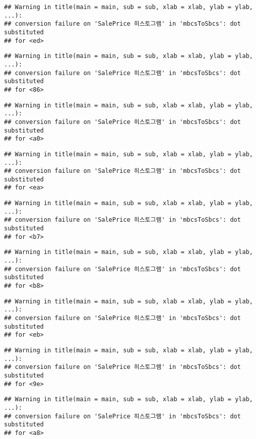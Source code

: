 \documentclass[
]{article}
\begin{document}
\begin{verbatim}
## Warning in title(main = main, sub = sub, xlab = xlab, ylab = ylab, ...):
## conversion failure on 'SalePrice 히스토그램' in 'mbcsToSbcs': dot substituted
## for <ed>
\end{verbatim}

\begin{verbatim}
## Warning in title(main = main, sub = sub, xlab = xlab, ylab = ylab, ...):
## conversion failure on 'SalePrice 히스토그램' in 'mbcsToSbcs': dot substituted
## for <86>
\end{verbatim}

\begin{verbatim}
## Warning in title(main = main, sub = sub, xlab = xlab, ylab = ylab, ...):
## conversion failure on 'SalePrice 히스토그램' in 'mbcsToSbcs': dot substituted
## for <a0>
\end{verbatim}

\begin{verbatim}
## Warning in title(main = main, sub = sub, xlab = xlab, ylab = ylab, ...):
## conversion failure on 'SalePrice 히스토그램' in 'mbcsToSbcs': dot substituted
## for <ea>
\end{verbatim}

\begin{verbatim}
## Warning in title(main = main, sub = sub, xlab = xlab, ylab = ylab, ...):
## conversion failure on 'SalePrice 히스토그램' in 'mbcsToSbcs': dot substituted
## for <b7>
\end{verbatim}

\begin{verbatim}
## Warning in title(main = main, sub = sub, xlab = xlab, ylab = ylab, ...):
## conversion failure on 'SalePrice 히스토그램' in 'mbcsToSbcs': dot substituted
## for <b8>
\end{verbatim}

\begin{verbatim}
## Warning in title(main = main, sub = sub, xlab = xlab, ylab = ylab, ...):
## conversion failure on 'SalePrice 히스토그램' in 'mbcsToSbcs': dot substituted
## for <eb>
\end{verbatim}

\begin{verbatim}
## Warning in title(main = main, sub = sub, xlab = xlab, ylab = ylab, ...):
## conversion failure on 'SalePrice 히스토그램' in 'mbcsToSbcs': dot substituted
## for <9e>
\end{verbatim}

\begin{verbatim}
## Warning in title(main = main, sub = sub, xlab = xlab, ylab = ylab, ...):
## conversion failure on 'SalePrice 히스토그램' in 'mbcsToSbcs': dot substituted
## for <a8>
\end{verbatim}
\end{document}
